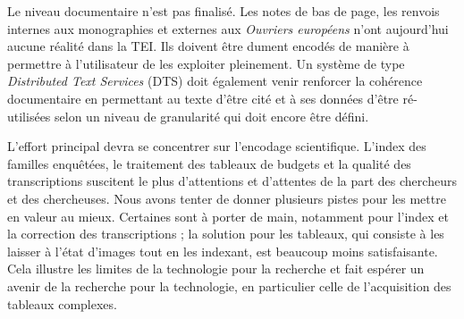 Le niveau documentaire n'est pas finalisé. Les notes de bas de page, les renvois internes aux monographies et externes aux \textit{Ouvriers européens} n'ont aujourd'hui aucune réalité dans la TEI. Ils doivent être dument encodés de manière à permettre à l'utilisateur de les exploiter pleinement. Un système de type \textit{Distributed Text Services} (DTS) doit également venir renforcer la cohérence documentaire en permettant au texte d'être cité et à ses données d'être ré-utilisées selon un niveau de granularité qui doit encore être défini.

L'effort principal devra se concentrer sur l'encodage scientifique. L'index des familles enquêtées, le traitement des tableaux de budgets et la qualité des transcriptions suscitent le plus d'attentions et d'attentes de la part des chercheurs et des chercheuses. Nous avons tenter de donner plusieurs pistes pour les mettre en valeur au mieux. Certaines sont à porter de main, notamment pour l'index et la correction des transcriptions ; la solution pour les tableaux, qui consiste à les laisser à l'état d'images tout en les indexant, est beaucoup moins satisfaisante. Cela illustre les limites de la technologie pour la recherche et fait espérer un avenir de la recherche pour la technologie, en particulier celle de l'acquisition des tableaux complexes.